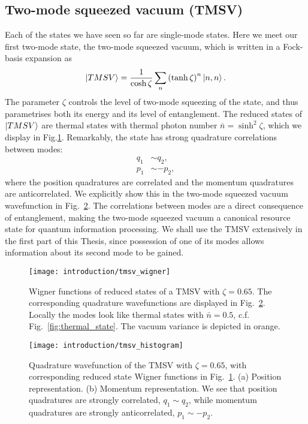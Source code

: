 \FloatBarrier
\subsection{Two-mode squeezed vacuum (TMSV)}
Each of the states we have seen so far are single-mode states. Here we meet our first two-mode state, the two-mode squeezed vacuum, which is written in a Fock-basis expansion as
\begin{equation}\label{eqn:intro_tmsv}
\ket{TMSV} = \frac{1}{\cosh \zeta} \sum_n \left( \tanh \zeta \right)^n \ket{n, n}.
\end{equation}
The parameter $\zeta$ controls the level of two-mode squeezing of the state, and thus parametrises both its energy and its level of entanglement. The reduced states of $\ket{TMSV}$ are thermal states with thermal photon number $\bar{n} = \sinh^2 \zeta$, which we display in Fig.\ref{fig:tmsv_wigner}. Remarkably, the state has strong quadrature correlations between modes:
\begin{align*}
q_1 &\sim q_2, \\
p_1 &\sim - p_2,
\end{align*}
where the position quadratures are correlated and the momentum quadratures are anticorrelated. We explicitly show this in the two-mode squeezed vacuum wavefunction in Fig.~\ref{fig:tmsv_histogram}. The correlations between modes are a direct consequence of entanglement, making the two-mode squeezed vacuum a canonical resource state for quantum information processing. We shall use the TMSV extensively in the first part of this Thesis, since possession of one of its modes allows information about its second mode to be gained.


\begin{figure}[htp]
\captionsetup{width=0.8\linewidth}
\centering
\texttt{[image: introduction/tmsv\_wigner]}
\caption{\label{fig:tmsv_wigner} Wigner functions of reduced states of a TMSV with $\zeta = 0.65$. The corresponding quadrature wavefunctions are displayed in Fig.~\ref{fig:tmsv_histogram}. Locally the modes look like thermal states with $\bar{n} = 0.5$, c.f. Fig.~\ref{fig:thermal_state}. The vacuum variance is depicted in orange.}
\end{figure}

\begin{figure}[htp]
\captionsetup{width=0.8\linewidth}
\centering
\texttt{[image: introduction/tmsv\_histogram]}
\caption{\label{fig:tmsv_histogram} Quadrature wavefunction of the TMSV with $\zeta = 0.65$, with corresponding reduced state Wigner functions in Fig.~\ref{fig:tmsv_wigner}. (a) Position representation. (b) Momentum representation. We see that position quadratures are strongly correlated, $q_1 \sim q_2$, while momentum quadratures are strongly anticorrelated, $p_1 \sim - p_2$.}
\end{figure}

